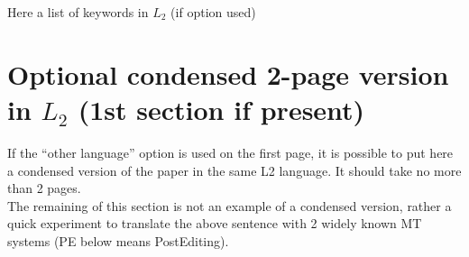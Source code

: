 \documentclass[10pt,a5paper,twoside]{article}
\begin{document}


{Here a list of keywords in $L_{2}$ (if option used)}

\newpage
\section{Optional condensed 2-page version in $L_{2}$ (1st section if present)}
If the “other language” option is used on the first page, it is possible to put here a condensed version of the paper in the same L2 language. It should take no more than 2 pages.\\
The remaining of this section is not an example of a condensed version, rather a quick experiment to translate the above sentence with 2 widely known MT systems (PE below means  PostEditing).
 
\end{document}
